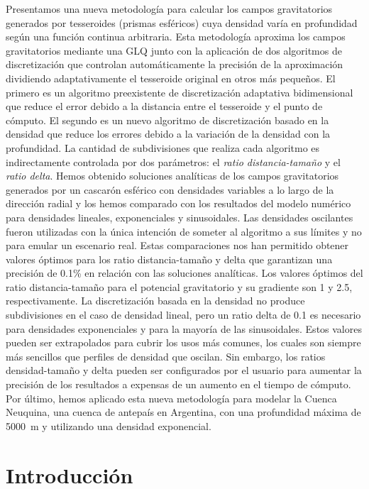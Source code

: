 Presentamos una nueva metodología para calcular los campos gravitatorios
generados por tesseroides (prismas esféricos) cuya densidad varía en
profundidad según una función continua arbitraria.
Esta metodología aproxima los campos gravitatorios mediante una \ac{GLQ} junto
con la aplicación de dos algoritmos de discretización que controlan
automáticamente la precisión de la aproximación dividiendo adaptativamente el
tesseroide original en otros más pequeños.
El primero es un algoritmo preexistente de discretización adaptativa
bidimensional que reduce el error debido a la distancia entre el tesseroide
y el punto de cómputo.
El segundo es un nuevo algoritmo de discretización basado en la densidad que
reduce los errores debido a la variación de la densidad con la profundidad.
La cantidad de subdivisiones que realiza cada algoritmo es indirectamente
controlada por dos parámetros: el \emph{ratio distancia-tamaño} y el
\emph{ratio delta}.
Hemos obtenido soluciones analíticas de los campos gravitatorios generados por
un cascarón esférico con densidades variables a lo largo de la dirección radial
y los hemos comparado con los resultados del modelo numérico para densidades
lineales, exponenciales y sinusoidales.
Las densidades oscilantes fueron utilizadas con la única intención de someter
al algoritmo a sus límites y no para emular un escenario real.
Estas comparaciones nos han permitido obtener valores óptimos para los ratio
distancia-tamaño y delta que garantizan una precisión de 0.1\% en relación con
las soluciones analíticas.
Los valores óptimos del ratio distancia-tamaño para el potencial gravitatorio
y su gradiente son 1 y 2.5, respectivamente.
La discretización basada en la densidad no produce subdivisiones en el caso de
densidad lineal, pero un ratio delta de 0.1 es necesario para densidades
exponenciales y para la mayoría de las sinusoidales.
Estos valores pueden ser extrapolados para cubrir los usos más comunes, los
cuales son siempre más sencillos que perfiles de densidad que oscilan.
Sin embargo, los ratios densidad-tamaño y delta pueden ser configurados por el
usuario para aumentar la precisión de los resultados a expensas de un aumento
en el tiempo de cómputo.
Por último, hemos aplicado esta nueva metodología para modelar la Cuenca
Neuquina, una cuenca de antepaís en Argentina, con una profundidad máxima de
5000~m y utilizando una densidad exponencial.


\section{Introducción}

